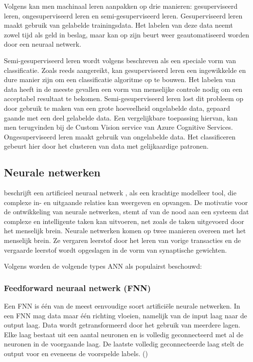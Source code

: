 Volgens \cite{SalimAlHabsib2019} kan men machinaal leren aanpakken op drie manieren: gesuperviseerd leren, ongesuperviseerd leren en semi-gesuperviseerd leren. Gesuperviseerd leren maakt gebruik van gelabelde trainingsdata. Het labelen van deze data neemt zowel tijd als geld in beslag, maar kan op zijn beurt weer geautomatiseerd worden door een neuraal netwerk.  



Semi-gesuperviseerd leren wordt volgens \cite{Zhu2005} beschreven als een speciale vorm van classificatie. Zoals reeds aangereikt, kan gesuperviseerd leren een ingewikkelde en dure manier zijn om een classificatie algoritme op te bouwen. Het labelen van data heeft in de meeste gevallen een vorm van menselijke controle nodig om een acceptabel resultaat te bekomen. Semi-gesuperviseerd leren lost dit probleem op door gebruik te maken van een grote hoeveelheid ongelabelde data, gepaard gaande met een deel gelabelde data. Een vergelijkbare toepassing hiervan, kan men terugvinden bij de Custom Vision service van Azure Cognitive Services. Ongesuperviseerd leren maakt gebruik van ongelabelde data. Het classificeren gebeurt hier door het clusteren van data met gelijkaardige patronen. 

\subsection{Neurale netwerken}

\cite{Kumar2016} beschrijft een  artificieel neuraal netwerk , als een krachtige modelleer tool, die complexe in- en uitgaande relaties kan weergeven en opvangen. De motivatie voor de ontwikkeling van neurale netwerken, stemt af van de nood aan een systeem dat complexe en intelligente taken kan uitvoeren, net zoals de taken uitgevoerd door het menselijk brein. Neurale netwerken komen op twee manieren overeen met het menselijk brein. Ze vergaren leerstof door het leren van vorige transacties en de vergaarde leerstof wordt opgeslagen in de vorm van synaptische gewichten.   


Volgens \cite{Microsoft2020d} worden de volgende types ANN als populairst beschouwd:

\subsubsection{Feedforward neuraal netwerk (FNN)}
Een FNN is één van de meest eenvoudige soort artificiële neurale netwerken. In een FNN mag data maar één richting vloeien, namelijk van de input laag naar de output laag. Data wordt getransformeerd door het gebruik van meerdere lagen. Elke laag bestaat uit een aantal neuronen en is volledig geconnecteerd met al de neuronen in de voorgaande laag. \newpage De laatste volledig geconnecteerde laag stelt de output voor en eveneens de voorspelde labels. (\cite{Microsoft2020d})

